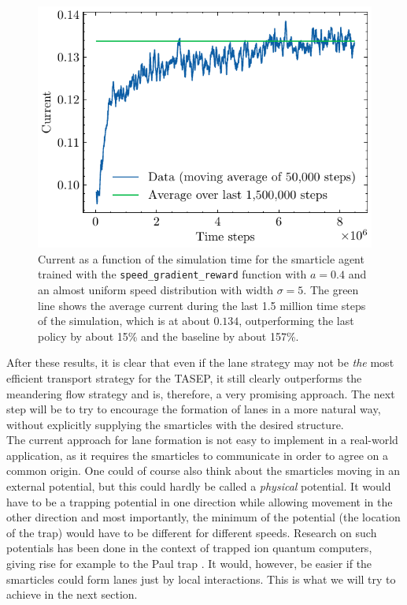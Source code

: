 \begin{figure}[H]
    \centering
    \includegraphics{speed_grad_current.pdf}
    \caption{Current as a function of the simulation time for the smarticle agent trained with the \texttt{speed\_gradient\_reward} function with $a=0.4$ and an almost uniform speed distribution with width $\sigma=5$. The green line shows the average current during the last 1.5 million time steps of the simulation, which is at about $0.134$, outperforming the last policy by about 15\% and the baseline by about 157\%.}
    \label{fig:speed_grad_current}
\end{figure}

After these results, it is clear that even if the lane strategy may not be \textit{the} most efficient transport strategy for the TASEP, it still clearly outperforms the meandering flow strategy and is, therefore, a very promising approach. The next step will be to try to encourage the formation of lanes in a more natural way, without explicitly supplying the smarticles with the desired structure.
\\
The current approach for lane formation is not easy to implement in a real-world application, as it requires the smarticles to communicate in order to agree on a common origin. One could of course also think about the smarticles moving in an external potential, but this could hardly be called a \textit{physical} potential. It would have to be a trapping potential in one direction while allowing movement in the other direction and most importantly, the minimum of the potential (the location of the trap) would have to be different for different speeds. Research on such potentials has been done in the context of trapped ion quantum computers, giving rise for example to the Paul trap \cite[II.A]{bruzewicz_trapped-ion_2019}. It would, however, be easier if the smarticles could form lanes just by local interactions. This is what we will try to achieve in the next section.

